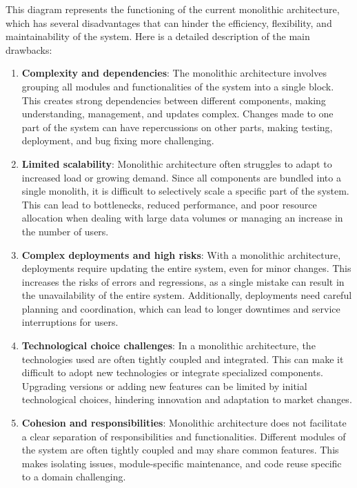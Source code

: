 This diagram represents the functioning of the current monolithic architecture, which has several disadvantages that can hinder the efficiency, flexibility, and maintainability of the system. Here is a detailed description of the main drawbacks:

\begin{enumerate}
\item \textbf{Complexity and dependencies}: The monolithic architecture involves grouping all modules and functionalities of the system into a single block. This creates strong dependencies between different components, making understanding, management, and updates complex. Changes made to one part of the system can have repercussions on other parts, making testing, deployment, and bug fixing more challenging.
\item \textbf{Limited scalability}: Monolithic architecture often struggles to adapt to increased load or growing demand. Since all components are bundled into a single monolith, it is difficult to selectively scale a specific part of the system. This can lead to bottlenecks, reduced performance, and poor resource allocation when dealing with large data volumes or managing an increase in the number of users.
\item \textbf{Complex deployments and high risks}: With a monolithic architecture, deployments require updating the entire system, even for minor changes. This increases the risks of errors and regressions, as a single mistake can result in the unavailability of the entire system. Additionally, deployments need careful planning and coordination, which can lead to longer downtimes and service interruptions for users.
\item \textbf{Technological choice challenges}: In a monolithic architecture, the technologies used are often tightly coupled and integrated. This can make it difficult to adopt new technologies or integrate specialized components. Upgrading versions or adding new features can be limited by initial technological choices, hindering innovation and adaptation to market changes.
\item \textbf{Cohesion and responsibilities}: Monolithic architecture does not facilitate a clear separation of responsibilities and functionalities. Different modules of the system are often tightly coupled and may share common features. This makes isolating issues, module-specific maintenance, and code reuse specific to a domain challenging.
\end{enumerate}

